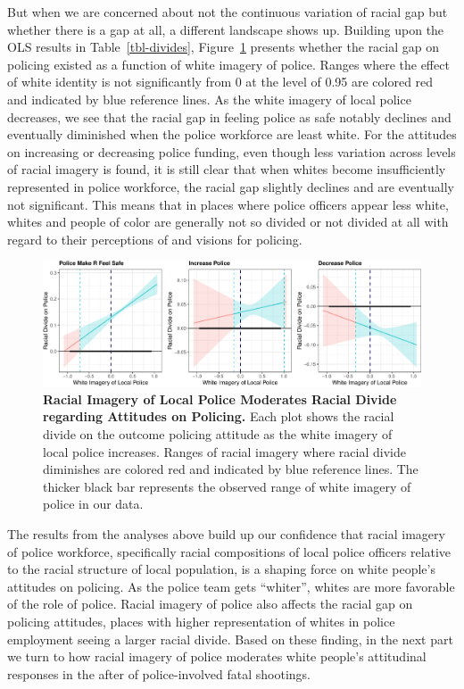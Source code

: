 \documentclass[
  12pt,
]{article}
\begin{document}
But when we are concerned about not the continuous variation of racial
gap but whether there is a gap at all, a different landscape shows up.
Building upon the OLS results in Table~\ref{tbl-divides},
Figure~\ref{fig-divides} presents whether the racial gap on policing
existed as a function of white imagery of police. Ranges where the
effect of white identity is not significantly from 0 at the level of
0.95 are colored red and indicated by blue reference lines. As the white
imagery of local police decreases, we see that the racial gap in feeling
police as safe notably declines and eventually diminished when the
police workforce are least white. For the attitudes on increasing or
decreasing police funding, even though less variation across levels of
racial imagery is found, it is still clear that when whites become
insufficiently represented in police workforce, the racial gap slightly
declines and are eventually not significant. This means that in places
where police officers appear less white, whites and people of color are
generally not so divided or not divided at all with regard to their
perceptions of and visions for policing.

\begin{figure}[tb]

{\centering \includegraphics{racialized-police_files/figure-pdf/fig-divides-1.pdf}

}

\caption{\label{fig-divides}\textbf{Racial Imagery of Local Police
Moderates Racial Divide regarding Attitudes on Policing.} Each plot
shows the racial divide on the outcome policing attitude as the white
imagery of local police increases. Ranges of racial imagery where racial
divide diminishes are colored red and indicated by blue reference lines.
The thicker black bar represents the observed range of white imagery of
police in our data.}

\end{figure}

The results from the analyses above build up our confidence that racial
imagery of police workforce, specifically racial compositions of local
police officers relative to the racial structure of local population, is
a shaping force on white people's attitudes on policing. As the police
team gets ``whiter'', whites are more favorable of the role of police.
Racial imagery of police also affects the racial gap on policing
attitudes, places with higher representation of whites in police
employment seeing a larger racial divide. Based on these finding, in the
next part we turn to how racial imagery of police moderates white
people's attitudinal responses in the after of police-involved fatal
shootings.
\end{document}
